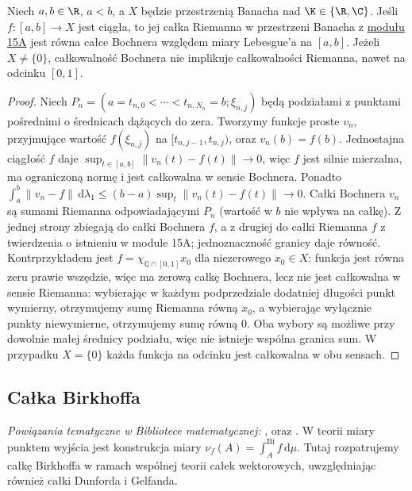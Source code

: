 \begin{stwierdzenie}
\label{prop:riemann-bochner15b}
Niech $a,b\in\R$, $a<b$, a $X$ będzie przestrzenią Banacha
nad $\K\in\{\R,\C\}$. Jeśli $f:[a,b]\to X$ jest ciągła, to jej całka Riemanna
w przestrzeni Banacha z \hyperref[sec:integral-lcs15a]{modułu 15A} jest równa całce Bochnera
względem miary Lebesgue'a na $[a,b]$. Jeżeli $X\ne\{0\}$, całkowalność Bochnera nie implikuje
całkowalności Riemanna, nawet na odcinku $[0,1]$.
\end{stwierdzenie}
\begin{proof}
Niech $P_n=(a=t_{n,0}<\cdots<t_{n,N_n}=b;\xi_{n,j})$
będą podziałami z punktami pośrednimi o średnicach
dążących do zera. Tworzymy funkcje proste $v_n$,
przyjmujące wartość $f(\xi_{n,j})$ na
$[t_{n,j-1},t_{n,j})$, oraz $v_n(b)=f(b)$.
Jednostajna ciągłość $f$ daje
$\sup_{t\in[a,b]}\|v_n(t)-f(t)\|\to0$, więc $f$ jest
silnie mierzalna, ma ograniczoną normę i jest całkowalna
w sensie Bochnera. Ponadto
$\int_a^b\|v_n-f\|\,\mathrm d\lambda_1
\le(b-a)\sup_t\|v_n(t)-f(t)\|\to0$.
Całki Bochnera $v_n$ są sumami Riemanna odpowiadającymi
$P_n$ (wartość w $b$ nie wpływa na całkę).
Z jednej strony zbiegają do całki Bochnera $f$,
a z drugiej do całki Riemanna $f$ z twierdzenia
o istnieniu w module 15A; jednoznaczność granicy daje równość.
Kontrprzykładem jest $f=\chi_{\mathbb Q\cap[0,1]}x_0$
dla niezerowego $x_0\in X$: funkcja jest równa zeru prawie
wszędzie, więc ma zerową całkę Bochnera, lecz nie jest
całkowalna w sensie Riemanna: wybierając w każdym
podprzedziale dodatniej długości punkt wymierny, otrzymujemy
sumę Riemanna równą $x_0$, a wybierając wyłącznie punkty
niewymierne, otrzymujemy sumę równą $0$. Oba wybory są
możliwe przy dowolnie małej średnicy podziału, więc nie
istnieje wspólna granica sum. W przypadku $X=\{0\}$
każda funkcja na odcinku jest całkowalna w obu sensach.
\end{proof}

\subsection{Całka Birkhoffa}
\label{sec:birkhoff15b}

\noindent\emph{Powiązania tematyczne w Bibliotece matematycznej:}
,
oraz
.
W teorii miary punktem wyjścia jest konstrukcja miary
$\nu_f(A)=\int_A^{\mathrm{Bi}}f\,\mathrm d\mu$.
Tutaj rozpatrujemy całkę Birkhoffa w ramach wspólnej
teorii całek wektorowych, uwzględniając również
całki Dunforda i Gelfanda.

